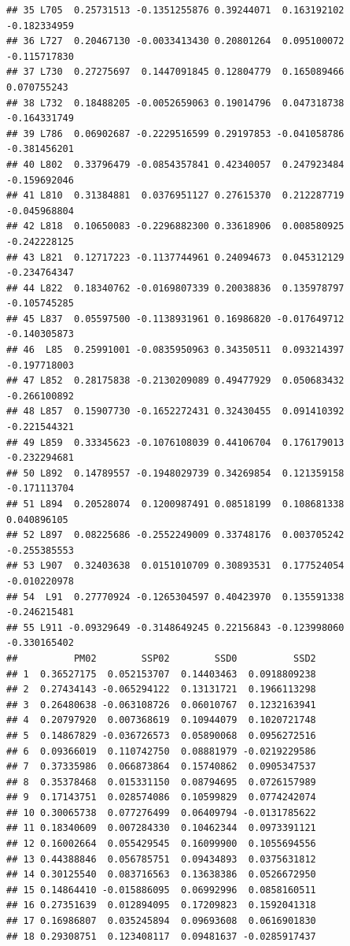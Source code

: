 \documentclass[
]{article}
\begin{document}
\begin{verbatim}
## 35 L705  0.25731513 -0.1351255876 0.39244071  0.163192102 -0.182334959
## 36 L727  0.20467130 -0.0033413430 0.20801264  0.095100072 -0.115717830
## 37 L730  0.27275697  0.1447091845 0.12804779  0.165089466  0.070755243
## 38 L732  0.18488205 -0.0052659063 0.19014796  0.047318738 -0.164331749
## 39 L786  0.06902687 -0.2229516599 0.29197853 -0.041058786 -0.381456201
## 40 L802  0.33796479 -0.0854357841 0.42340057  0.247923484 -0.159692046
## 41 L810  0.31384881  0.0376951127 0.27615370  0.212287719 -0.045968804
## 42 L818  0.10650083 -0.2296882300 0.33618906  0.008580925 -0.242228125
## 43 L821  0.12717223 -0.1137744961 0.24094673  0.045312129 -0.234764347
## 44 L822  0.18340762 -0.0169807339 0.20038836  0.135978797 -0.105745285
## 45 L837  0.05597500 -0.1138931961 0.16986820 -0.017649712 -0.140305873
## 46  L85  0.25991001 -0.0835950963 0.34350511  0.093214397 -0.197718003
## 47 L852  0.28175838 -0.2130209089 0.49477929  0.050683432 -0.266100892
## 48 L857  0.15907730 -0.1652272431 0.32430455  0.091410392 -0.221544321
## 49 L859  0.33345623 -0.1076108039 0.44106704  0.176179013 -0.232294681
## 50 L892  0.14789557 -0.1948029739 0.34269854  0.121359158 -0.171113704
## 51 L894  0.20528074  0.1200987491 0.08518199  0.108681338  0.040896105
## 52 L897  0.08225686 -0.2552249009 0.33748176  0.003705242 -0.255385553
## 53 L907  0.32403638  0.0151010709 0.30893531  0.177524054 -0.010220978
## 54  L91  0.27770924 -0.1265304597 0.40423970  0.135591338 -0.246215481
## 55 L911 -0.09329649 -0.3148649245 0.22156843 -0.123998060 -0.330165402
##          PM02        SSP02        SSD0          SSD2
## 1  0.36527175  0.052153707  0.14403463  0.0918809238
## 2  0.27434143 -0.065294122  0.13131721  0.1966113298
## 3  0.26480638 -0.063108726  0.06010767  0.1232163941
## 4  0.20797920  0.007368619  0.10944079  0.1020721748
## 5  0.14867829 -0.036726573  0.05890068  0.0956272516
## 6  0.09366019  0.110742750  0.08881979 -0.0219229586
## 7  0.37335986  0.066873864  0.15740862  0.0905347537
## 8  0.35378468  0.015331150  0.08794695  0.0726157989
## 9  0.17143751  0.028574086  0.10599829  0.0774242074
## 10 0.30065738  0.077276499  0.06409794 -0.0131785622
## 11 0.18340609  0.007284330  0.10462344  0.0973391121
## 12 0.16002664  0.055429545  0.16099900  0.1055694556
## 13 0.44388846  0.056785751  0.09434893  0.0375631812
## 14 0.30125540  0.083716563  0.13638386  0.0526672950
## 15 0.14864410 -0.015886095  0.06992996  0.0858160511
## 16 0.27351639  0.012894095  0.17209823  0.1592041318
## 17 0.16986807  0.035245894  0.09693608  0.0616901830
## 18 0.29308751  0.123408117  0.09481637 -0.0285917437

\end{verbatim}
\end{document}
